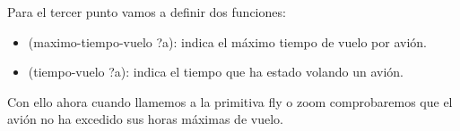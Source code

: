 \documentclass[12pt,a4paper]{article}
\begin{document}
Para el tercer punto vamos a definir dos funciones:
\begin{itemize}
	\item (maximo-tiempo-vuelo ?a): indica el máximo tiempo de vuelo por avión.
	\item (tiempo-vuelo ?a): indica el tiempo que ha estado volando un avión.
\end{itemize}

Con ello ahora cuando llamemos a la primitiva fly o zoom comprobaremos que el avión no ha excedido sus horas máximas de vuelo.
\end{document}
